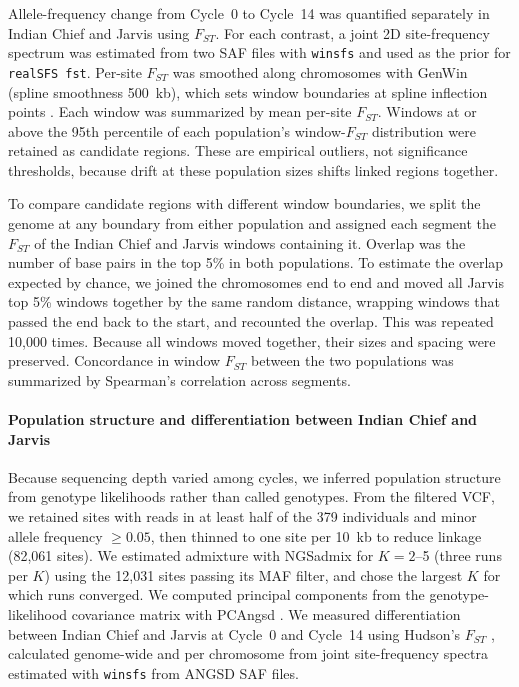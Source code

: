 \documentclass[11pt]{article}
\begin{document}
Allele-frequency change from Cycle~0 to Cycle~14 was quantified separately in Indian Chief and Jarvis using $F_{ST}$. For each contrast, a joint 2D site-frequency spectrum was estimated from two SAF files with \texttt{winsfs} \citep{Rasmussen2022winsfs} and used as the prior for \texttt{realSFS fst}. Per-site $F_{ST}$ was smoothed along chromosomes with GenWin (spline smoothness 500~kb), which sets window boundaries at spline inflection points \citep{Beissinger2015GenWin}. Each window was summarized by mean per-site $F_{ST}$. Windows at or above the 95th percentile of each population’s window-$F_{ST}$ distribution were retained as candidate regions. These are empirical outliers, not significance thresholds, because drift at these population sizes shifts linked regions together.

To compare candidate regions with different window boundaries, we split the genome at any boundary from either population and assigned each segment the $F_{ST}$ of the Indian Chief and Jarvis windows containing it. Overlap was the number of base pairs in the top 5\% in both populations. To estimate the overlap expected by chance, we joined the chromosomes end to end and moved all Jarvis top 5\% windows together by the same random distance, wrapping windows that passed the end back to the start, and recounted the overlap. This was repeated 10,000 times. Because all windows moved together, their sizes and spacing were preserved. Concordance in window $F_{ST}$ between the two populations was summarized by Spearman’s correlation across segments.

\paragraph*{Population structure and differentiation between Indian Chief and Jarvis}

Because sequencing depth varied among cycles, we inferred population structure from genotype likelihoods rather than called genotypes. From the filtered VCF, we retained sites with reads in at least half of the 379 individuals and minor allele frequency $\ge 0.05$, then thinned to one site per 10~kb to reduce linkage (82,061 sites). We estimated admixture with NGSadmix \citep{Skotte2013NGSadmix} for $K=2$--5 (three runs per $K$) using the 12,031 sites passing its MAF filter, and chose the largest $K$ for which runs converged. We computed principal components from the genotype-likelihood covariance matrix with PCAngsd \citep{Meisner2018PCAngsd}. We measured differentiation between Indian Chief and Jarvis at Cycle~0 and Cycle~14 using Hudson's $F_{ST}$ \citep{Bhatia2013Fst}, calculated genome-wide and per chromosome from joint site-frequency spectra estimated with \texttt{winsfs} \citep{Rasmussen2022winsfs} from ANGSD SAF files.
\end{document}
